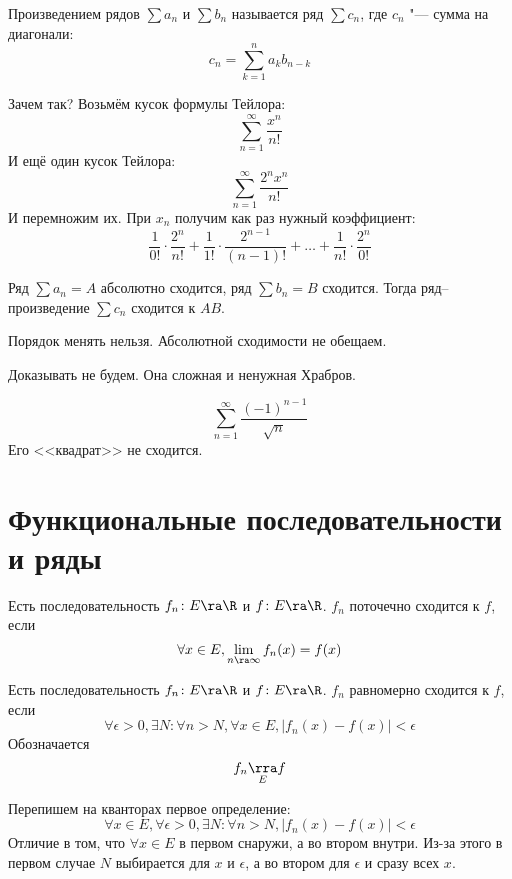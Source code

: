 \begin{Def}
	Произведением рядов $\sum a_n$ и $\sum b_n$ называется ряд $\sum c_n$, где $c_n$ "--- сумма на диагонали:
	\[ c_n = \sum_{k=1}^n a_k b_{n-k}\]
\end{Def}

\begin{Rem}
	Зачем так?
	Возьмём кусок формулы Тейлора:
	\[ \sum_{n=1}^\infty \frac{x^n}{n!} \]
	И ещё один кусок Тейлора:
	\[ \sum_{n=1}^\infty \frac{2^nx^n}{n!} \]
	И перемножим их.
	При $x_n$ получим как раз нужный коэффициент: 
	\[ \frac{1}{0!} \cdot \frac{2^n}{n!} + \frac{1}{1!} \cdot \frac{2^{n-1}}{(n-1)!} + \dots + \frac{1}{n!}\cdot\frac{2^n}{0!} \]
\end{Rem}

\begin{theorem}[Мертенса]
	Ряд $\sum a_n = A$ абсолютно сходится,
	ряд $\sum b_n = B$ сходится.
	Тогда ряд--произведение $\sum c_n$ сходится к $AB$.
\end{theorem}
\begin{Rem}
	Порядок менять нельзя. Абсолютной сходимости не обещаем.
\end{Rem}

Доказывать не будем. Она сложная и ненужная \textcopyright Храбров.

\begin{Exercise}
	\[ \sum_{n=1}^\infty \frac{(-1)^{n-1}}{\sqrt n} \]
	Его <<квадрат>> не сходится.
\end{Exercise}

\section[Функциональные посл-ти и ряды]{Функциональные последовательности и ряды}

\begin{Def}
	Есть последовательность $f_n \colon E \ra \R$ и $f \colon E \ra \R$.
	$f_n$ поточечно сходится к $f$, если
	\[ \forall x \in E, \lim_{n \ra \infty} f_n(x) = f(x) \]
\end{Def}

\begin{Def}
	Есть последовательность $f_n \colon E \ra \R$ и $f \colon E \ra \R$.
	$f_n$ равномерно сходится к $f$, если
	\[ \forall \epsilon > 0, \exists N\colon \forall n > N, \forall x \in E, |f_n(x) - f(x)| < \epsilon \]
	Обозначается
	\[ f_n \underset{E}\rra f \]
\end{Def}

Перепишем на кванторах первое определение:
\[ \forall x \in E, \forall \epsilon > 0, \exists N\colon \forall n > N, |f_n(x) - f(x)| < \epsilon \]
Отличие в том, что $\forall x \in E$ в первом снаружи, а во втором внутри.
Из-за этого в первом случае $N$ выбирается для $x$ и $\epsilon$, а во втором для $\epsilon$ и сразу всех $x$.

